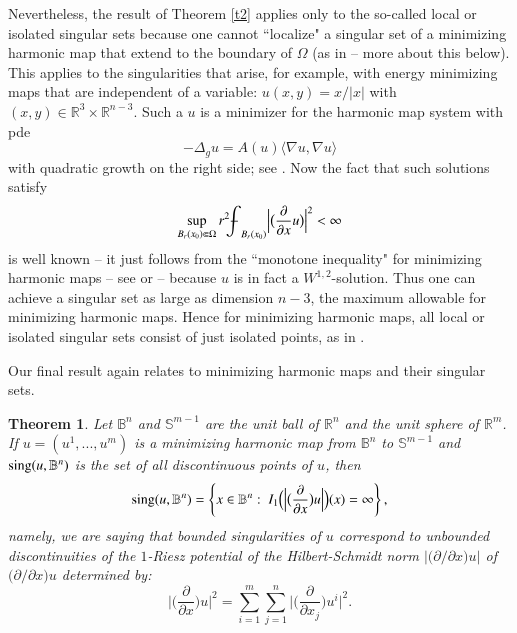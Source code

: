 \documentclass[12pt]{amsart}
\newtheorem{theorem}{Theorem}[section]
\begin{document}
Nevertheless, the result of Theorem \ref{t2} applies only to the so-called local or isolated singular sets because one cannot ``localize" a singular set of a minimizing harmonic map that extend to the boundary of $\Omega$ (as in \cite{HL1990} -- more about this below). This applies to the singularities that arise, for example, with energy minimizing maps that are independent of a variable:
$u(x,y)={x}/{|x|}$ with $(x,y)\in\mathbb R^3\times\mathbb R^{n-3}$. Such a $u$ is a minimizer for the harmonic map system with pde
$$
-\Delta_g u=A(u)\langle \nabla u,\nabla u\rangle
$$
with quadratic growth on the right side; see \cite{LW2008}. Now the fact that such solutions satisfy
$$
\sup_{B_r(x_0)\Subset\Omega}r^2{{\mathchoice
{{{\setbox0=\hbox{$\displaystyle{\textstyle{-}}{\int}$ }
\vcenter{\hbox{$\textstyle{-}$ }}\kern-.6\wd0}}}{{{\setbox0=\hbox{$\textstyle{\scriptstyle{-}}{\int}$ }
\vcenter{\hbox{$\scriptstyle{-}$ }}\kern-.6\wd0}}}{{{\setbox0=\hbox{$\scriptstyle{\scriptscriptstyle{-}}{\int}$ }
\vcenter{\hbox{$\scriptscriptstyle{-}$ }}\kern-.6\wd0}}}{{{\setbox0=\hbox{$\scriptscriptstyle{\scriptscriptstyle{-}}{\int}$ }
\vcenter{\hbox{$\scriptscriptstyle{-}$ }}\kern-.6\wd0}}}\!\int}}_{B_r(x_0)}\Big|\big(\frac{\partial}{\partial x}u\big)\Big|^2<\infty
$$
is well known -- it just follows from the ``monotone inequality" for minimizing harmonic maps -- see \cite[Chapter IX]{G1983} or \cite{LW2008} -- because $u$ is in fact a $W^{1,2}$-solution. Thus one can achieve a singular set as large as dimension $n-3$, the maximum allowable for minimizing harmonic maps. Hence for minimizing harmonic maps, all local or isolated singular sets consist of just isolated points, as in \cite{HL1990}.

Our final result again relates to minimizing harmonic maps and their singular sets.

\begin{theorem}\label{t3} Let $\mathbb B^n$ and $\mathbb S^{m-1}$ are the unit ball of $\mathbb R^n$ and the unit sphere of $\mathbb R^m$. If $u=(u^1,...,u^m)$ is a minimizing harmonic map from $\mathbb B^n$ to $\mathbb S^{m-1}$ and $\hbox{sing}(u,\mathbb B^n)$ is the set of all discontinuous points of $u$, then
\begin{equation}\label{eqF}
\hbox{sing}(u,\mathbb B^n)=\left\{x\in\mathbb B^n:\ I_1\Big(\Big|\big(\frac{\partial}{\partial x}\big)u\Big|\Big)(x)=\infty\right\},
\end{equation}
  namely, we are saying that bounded singularities of $u$ correspond to unbounded discontinuities of the $1$-Riesz potential of the Hilbert-Schmidt norm $|\big({\partial}/{\partial x}\big)u|$ of $\big({\partial}/{\partial x}\big)u$ determined by:
$$
\Big|\big(\frac{\partial}{\partial x}\big)u\Big|^2=\sum_{i=1}^m\sum_{j=1}^n\Big|\big(\frac{\partial}{\partial x_j}\big)u^i\Big|^2.
$$
\end{theorem}
\end{document}
